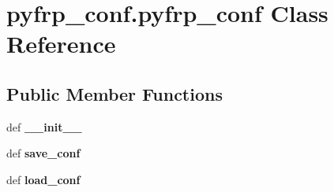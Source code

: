 \hypertarget{classpyfrp__conf_1_1pyfrp__conf}{\section{pyfrp\+\_\+conf.\+pyfrp\+\_\+conf Class Reference}
\label{classpyfrp__conf_1_1pyfrp__conf}
}
\subsection*{Public Member Functions}
\begin{DoxyCompactItemize}
\item 
\hypertarget{classpyfrp__conf_1_1pyfrp__conf_ae3e5bd676b4470ff4abc378af8092a33}{def {\bfseries \+\_\+\+\_\+init\+\_\+\+\_\+}}\label{classpyfrp__conf_1_1pyfrp__conf_ae3e5bd676b4470ff4abc378af8092a33}

\item 
\hypertarget{classpyfrp__conf_1_1pyfrp__conf_a02c13ff7006e76b615c2dd8506ca51a1}{def {\bfseries save\+\_\+conf}}\label{classpyfrp__conf_1_1pyfrp__conf_a02c13ff7006e76b615c2dd8506ca51a1}

\item 
\hypertarget{classpyfrp__conf_1_1pyfrp__conf_a060d6122890af9de31768a03528769ce}{def {\bfseries load\+\_\+conf}}\label{classpyfrp__conf_1_1pyfrp__conf_a060d6122890af9de31768a03528769ce}

\end{DoxyCompactItemize}
